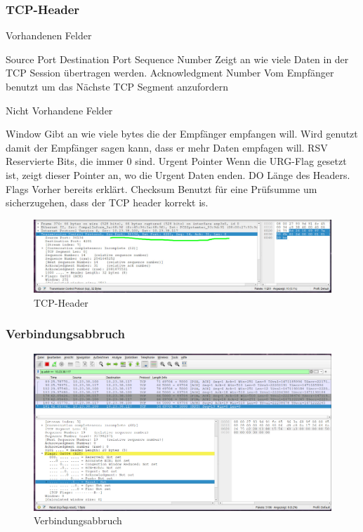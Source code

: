 \documentclass[a4paper]{article}
\begin{document}
\subsubsection{TCP-Header}
Vorhandenen Felder
\begin{outline}
	\1 Source Port
	\1 Destination Port
	\1 Sequence Number
	\2 Zeigt an wie viele Daten in der TCP Session übertragen werden.
	\1 Acknowledgment Number
	\2 Vom Empfänger benutzt um das Nächste TCP Segment anzufordern
\end{outline}
Nicht Vorhandene Felder
\begin{outline}
	\1 Window
	\2 Gibt an wie viele bytes die der Empfänger empfangen will. Wird genutzt damit der Empfänger sagen kann, dass er mehr Daten empfagen will.
	\1 RSV
	 Reservierte Bits, die immer 0 sind.
	\1 Urgent Pointer
	\2 Wenn die URG-Flag gesetzt ist, zeigt dieser Pointer an, wo die Urgent Daten enden.
	\1 DO
	\2 Länge des Headers.
	\1 Flags
	\2 Vorher bereits erklärt.
	\1 Checksum
	\2 Benutzt für eine Prüfsumme um sicherzugehen, dass der TCP header korrekt is.
\end{outline}
\cite{TCP-Header}
\begin{figure}[h]
	\includegraphics[scale=0.2]{images/tcp-header.jpeg}
	\caption{TCP-Header}
\end{figure}
\newpage
\subsubsection{Verbindungsabbruch}
\begin{figure}[ht]
	\includegraphics[scale=0.2]{images/verbindungsabbruch.png}
	\caption{Verbindungsabbruch}
\end{figure}
\end{document}
